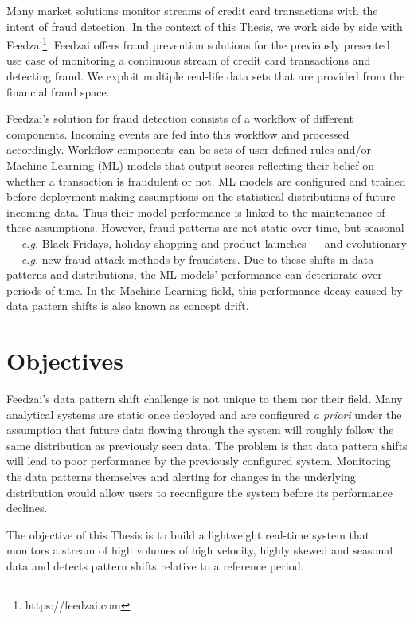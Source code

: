 Many market solutions monitor streams of credit card transactions with the intent of fraud detection. In the context of this Thesis, we work side by side with Feedzai\footnote{https://feedzai.com}. Feedzai offers fraud prevention solutions for the previously presented use case of monitoring a continuous stream of credit card transactions and detecting fraud. We exploit multiple real-life data sets that are provided from the financial fraud space. 

Feedzai's solution for fraud detection consists of a workflow of different components. Incoming events are fed into this workflow and processed accordingly. Workflow components can be sets of user-defined rules and/or Machine Learning (ML) models that output scores reflecting their belief on whether a transaction is fraudulent or not. ML models are configured and trained before deployment making assumptions on the statistical distributions of future incoming data. Thus their model performance is linked to the maintenance of these assumptions. However, fraud patterns are not static over time, but seasonal --- \textit{e.g.} Black Fridays, holiday shopping and product launches --- and evolutionary --- \textit{e.g.} new fraud attack methods by fraudsters. Due to these shifts in data patterns and distributions, the ML models' performance can deteriorate over periods of time. In the Machine Learning field, this performance decay caused by data pattern shifts is also known as concept drift.

\section{Objectives} \label{sec:objectives}
Feedzai's data pattern shift challenge is not unique to them nor their field. Many analytical systems are static once deployed and are configured \textit{a priori} under the assumption that future data flowing through the system will roughly follow the same distribution as previously seen data.
The problem is that data pattern shifts will lead to poor performance by the previously configured system. Monitoring the data patterns themselves and alerting for changes in the underlying distribution would allow users to reconfigure the system before its performance declines.

The objective of this Thesis is to build a lightweight real-time system that monitors a stream of high volumes of high velocity, highly skewed and seasonal data and detects pattern shifts relative to a reference period.


